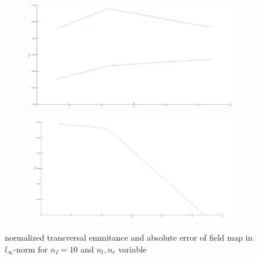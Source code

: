 \begin{center}
\begin{figure}[H]
   \begin{subfigure}{0.45\textwidth}
      \includegraphics[width=\textwidth]{fig/sc_cvg_rl=4}
   \end{subfigure}
   \begin{subfigure}{0.45\textwidth}
      \includegraphics[width=\textwidth]{fig/sc_cvg_rl=5}
   \end{subfigure}
   \caption{normalized transversal emmitance and absolute error of field map in $l_\infty$-norm for $n_I=10$ and $n_l, n_r$ variable}
   \label{fig:sc_cvg_rl}
\end{figure}
\end{center}

